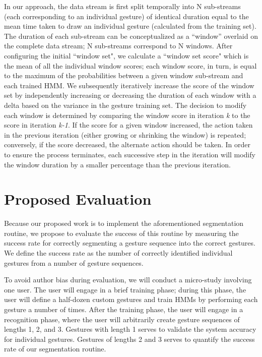 \documentclass[twoside]{article}
\begin{document}
\begin{multicols}{2}
In our approach, the data stream is first split temporally into N sub-streams
(each corresponding to an individual gesture) of identical duration equal to the
mean time taken to draw an individual gesture (calculated from the training
set). The duration of each sub-stream can be conceptualized as a ``window'' overlaid
on the complete data stream; N sub-streams correspond to N windows. After
configuring the initial ``window set", we calculate a ``window set score" which
is the mean of all the individual window scores; each window score, in turn, is
equal to the maximum of the probabilities between a given window sub-stream and
each trained HMM. We subsequently iteratively increase the score of the window
set by independently increasing or decreasing the duration of each window with a
delta based on the variance in the gesture training set. The decision to modify
each window is determined by comparing the window score in iteration \emph{k} to
the score in iteration \emph{k-1}. If the score for a given window increased,
the action taken in the previous iteration (either growing or shrinking the
window) is repeated; conversely, if the score decreased, the alternate action
should be taken. In order to ensure the process terminates, each successive step
in the iteration will modify the window duration by a smaller percentage than
the previous iteration.

\section{Proposed Evaluation}

Because our proposed work is to implement the aforementioned segmentation
routine, we propose to evaluate the success of this routine by measuring the
success rate for correctly segmenting a gesture sequence into the correct
gestures. We define the success rate as the number of correctly identified
individual gestures from a number of gesture sequences.

To avoid author bias during evaluation, we will conduct a micro-study involving one user. The user
will engage in a brief training phase; during this phase, the user will define a
half-dozen custom gestures and train HMMs by performing each gesture a number of
times. After the training phase, the user will engage in a recognition phase, where the
user will arbitrarily create gesture sequences of lengths 1, 2, and 3. Gestures with length 1
serves to validate the system accuracy for individual gestures. Gestures of lengths 2 and 3 serves to quantify the success rate of our segmentation routine.


\end{multicols}
\end{document}
